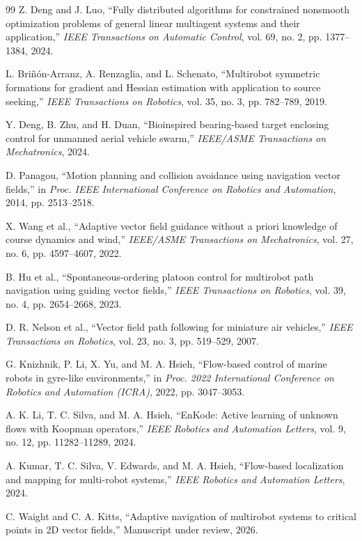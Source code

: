 \documentclass[lettersize,journal]{IEEEtran}
\begin{document}
\begin{thebibliography}{99}
 Z. Deng and J. Luo, ``Fully distributed algorithms for constrained nonsmooth optimization problems of general linear multiagent systems and their application,'' \textit{IEEE Transactions on Automatic Control}, vol. 69, no. 2, pp. 1377--1384, 2024.

 L. Bri\~n\'on-Arranz, A. Renzaglia, and L. Schenato, ``Multirobot symmetric formations for gradient and Hessian estimation with application to source seeking,'' \textit{IEEE Transactions on Robotics}, vol. 35, no. 3, pp. 782--789, 2019.

 Y. Deng, B. Zhu, and H. Duan, ``Bioinspired bearing-based target enclosing control for unmanned aerial vehicle swarm,'' \textit{IEEE/ASME Transactions on Mechatronics}, 2024.

 D. Panagou, ``Motion planning and collision avoidance using navigation vector fields,'' in \textit{Proc. IEEE International Conference on Robotics and Automation}, 2014, pp. 2513--2518.

 X. Wang et al., ``Adaptive vector field guidance without a priori knowledge of course dynamics and wind,'' \textit{IEEE/ASME Transactions on Mechatronics}, vol. 27, no. 6, pp. 4597--4607, 2022.

 B. Hu et al., ``Spontaneous-ordering platoon control for multirobot path navigation using guiding vector fields,'' \textit{IEEE Transactions on Robotics}, vol. 39, no. 4, pp. 2654--2668, 2023.

 D. R. Nelson et al., ``Vector field path following for miniature air vehicles,'' \textit{IEEE Transactions on Robotics}, vol. 23, no. 3, pp. 519--529, 2007.

 G. Knizhnik, P. Li, X. Yu, and M. A. Hsieh, ``Flow-based control of marine robots in gyre-like environments,'' in \textit{Proc. 2022 International Conference on Robotics and Automation (ICRA)}, 2022, pp. 3047--3053.

 A. K. Li, T. C. Silva, and M. A. Hsieh, ``EnKode: Active learning of unknown flows with Koopman operators,'' \textit{IEEE Robotics and Automation Letters}, vol. 9, no. 12, pp. 11282--11289, 2024.

 A. Kumar, T. C. Silva, V. Edwards, and M. A. Hsieh, ``Flow-based localization and mapping for multi-robot systems,'' \textit{IEEE Robotics and Automation Letters}, 2024.

 C. Waight and C. A. Kitts, ``Adaptive navigation of multirobot systems to critical points in 2D vector fields,'' Manuscript under review, 2026.


\end{thebibliography}
\end{document}
